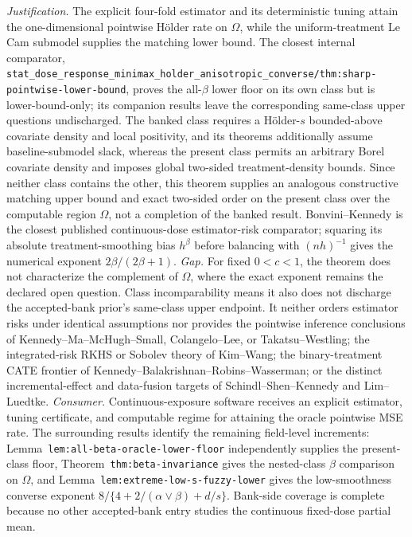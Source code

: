 \documentclass{article}
\begin{document}
\par\smallskip\noindent \textit{Justification.} The explicit four-fold estimator and its deterministic tuning attain the one-dimensional pointwise H\"older rate on \(\Omega\), while the uniform-treatment Le Cam submodel supplies the matching lower bound. The closest internal comparator, \texttt{stat\_dose\_response\_minimax\_holder\_anisotropic\_converse/thm:sharp-pointwise-lower-bound}, proves the all-\(\beta\) lower floor on its own class but is lower-bound-only; its companion results leave the corresponding same-class upper questions undischarged. The banked class requires a H\"older-\(s\) bounded-above covariate density and local positivity, and its theorems additionally assume baseline-submodel slack, whereas the present class permits an arbitrary Borel covariate density and imposes global two-sided treatment-density bounds. Since neither class contains the other, this theorem supplies an analogous constructive matching upper bound and exact two-sided order on the present class over the computable region \(\Omega\), not a completion of the banked result. Bonvini--Kennedy is the closest published continuous-dose estimator-risk comparator; squaring its absolute treatment-smoothing bias \(h^\beta\) before balancing with \((nh)^{-1}\) gives the numerical exponent \(2\beta/(2\beta+1)\). \textit{Gap.} For fixed \(0<c<1\), the theorem does not characterize the complement of \(\Omega\), where the exact exponent remains the declared open question. Class incomparability means it also does not discharge the accepted-bank prior's same-class upper endpoint. It neither orders estimator risks under identical assumptions nor provides the pointwise inference conclusions of Kennedy--Ma--McHugh--Small, Colangelo--Lee, or Takatsu--Westling; the integrated-risk RKHS or Sobolev theory of Kim--Wang; the binary-treatment CATE frontier of Kennedy--Balakrishnan--Robins--Wasserman; or the distinct incremental-effect and data-fusion targets of Schindl--Shen--Kennedy and Lim--Luedtke. \textit{Consumer.} Continuous-exposure software receives an explicit estimator, tuning certificate, and computable regime for attaining the oracle pointwise MSE rate. The surrounding results identify the remaining field-level increments: Lemma~\texttt{lem:all-beta-oracle-lower-floor} independently supplies the present-class floor, Theorem~\texttt{thm:beta-invariance} gives the nested-class \(\beta\) comparison on \(\Omega\), and Lemma~\texttt{lem:extreme-low-s-fuzzy-lower} gives the low-smoothness converse exponent \(8/\{4+2/(\alpha\vee\beta)+d/s\}\). Bank-side coverage is complete because no other accepted-bank entry studies the continuous fixed-dose partial mean.
\end{document}
